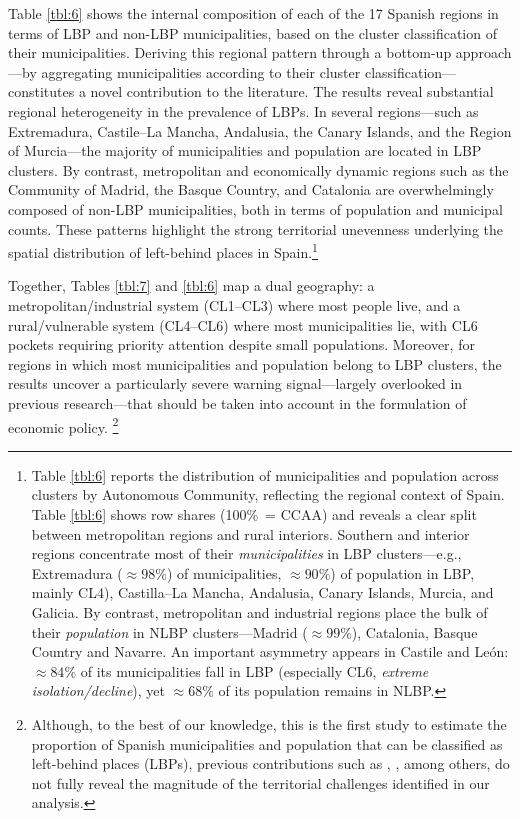 \documentclass[a4paper,11pt,oneside]{article}
\begin{document}
Table \ref{tbl:6} shows the internal composition of each of the 17 Spanish regions in terms of LBP and non-LBP municipalities, based on the cluster classification of their municipalities. Deriving this regional pattern through a bottom-up approach—by aggregating municipalities according to their cluster classification—constitutes a novel contribution to the literature. The results reveal substantial regional heterogeneity in the prevalence of LBPs. In several regions—such as Extremadura, Castile--La Mancha, Andalusia, the Canary Islands, and the Region of Murcia—the majority of municipalities and population are located in LBP clusters. By contrast, metropolitan and economically dynamic regions such as the Community of Madrid, the Basque Country, and Catalonia are overwhelmingly composed of non-LBP municipalities, both in terms of population and municipal counts. These patterns highlight the strong territorial unevenness underlying the spatial distribution of left-behind places in Spain.\footnote{Table \ref{tbl:6} reports the distribution of municipalities and population across clusters by Autonomous Community, reflecting the regional context of Spain. Table \ref{tbl:6} shows row shares (100\%~= CCAA) and reveals a clear split between metropolitan regions and rural interiors. Southern and interior regions concentrate most of their \textsl{municipalities} in LBP clusters---e.g., Extremadura ($\approx 98\%$) of municipalities, $\approx 90\%$) of population in LBP, mainly CL4),
Castilla--La Mancha, Andalusia, Canary Islands, Murcia, and Galicia. By contrast, metropolitan and industrial regions place the bulk of their \textsl{population} in NLBP clusters---Madrid ($\approx 99\%$), Catalonia, Basque Country and Navarre.
An important asymmetry appears in Castile and León: $\approx 84\%$ of its municipalities fall in LBP (especially CL6, \textsl{extreme isolation/decline}), yet $\approx 68\%$ of its population remains in NLBP.}




Together, Tables \ref{tbl:7} and \ref{tbl:6} map a dual geography: a metropolitan/industrial system (CL1--CL3) where most people live, and a rural/vulnerable system (CL4--CL6) where most municipalities lie, with CL6 pockets requiring priority attention despite small populations. Moreover, for regions in which most municipalities and population belong to LBP clusters, the results uncover a particularly severe warning signal—largely overlooked in previous research—that should be taken into account in the formulation of economic policy. \footnote{Although, to the best of our knowledge, this is the first study to estimate the proportion of Spanish municipalities and population that can be classified as left-behind places (LBPs), previous contributions such as  \cite{bde2021distribucion}, \cite{villamayor2024espana}, among others, do not fully reveal the magnitude of the territorial challenges identified in our analysis.}
\end{document}
